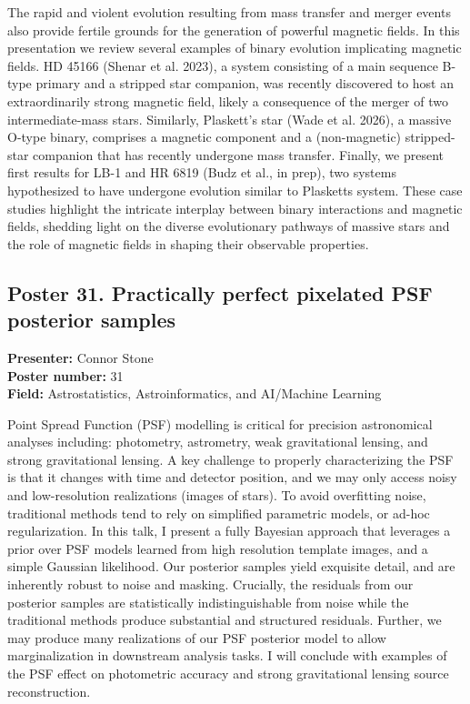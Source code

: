 The rapid and violent evolution resulting from mass transfer and merger events also provide fertile grounds for the generation of powerful magnetic fields. In this presentation we review several examples of binary evolution implicating magnetic fields. HD 45166 (Shenar et al. 2023), a system consisting of a main sequence B-type primary and a stripped star companion, was recently discovered to host an extraordinarily strong magnetic field, likely a consequence of the merger of two intermediate-mass stars. Similarly, Plaskett's star (Wade et al. 2026), a massive O-type binary, comprises a magnetic component and a (non-magnetic) stripped-star companion that has recently undergone mass transfer. Finally, we present first results for LB-1 and HR 6819 (Budz et al., in prep), two systems hypothesized to have undergone evolution similar to Plasketts system. These case studies highlight the intricate interplay between binary interactions and magnetic fields, shedding light on the diverse evolutionary pathways of massive stars and the role of magnetic fields in shaping their observable properties.

\hypertarget{poster-abstract-talk-25}{}\label{poster-abstract-page-talk-25}
\subsection*{Poster 31. Practically perfect pixelated PSF posterior samples}
\textbf{Presenter:} Connor Stone\\
\textbf{Poster number:} 31\\
\textbf{Field:} Astrostatistics, Astroinformatics, and AI/Machine Learning

Point Spread Function (PSF) modelling is critical for precision astronomical analyses including: photometry, astrometry, weak gravitational lensing, and strong gravitational lensing. A key challenge to properly characterizing the PSF is that it changes with time and detector position, and we may only access noisy and low-resolution realizations (images of stars). To avoid overfitting noise, traditional methods tend to rely on simplified parametric models, or ad-hoc regularization. In this talk, I present a fully Bayesian approach that leverages a prior over PSF models learned from high resolution template images, and a simple Gaussian likelihood. Our posterior samples yield exquisite detail, and are inherently robust to noise and masking. Crucially, the residuals from our posterior samples are statistically indistinguishable from noise while the traditional methods produce substantial and structured residuals. Further, we may produce many realizations of our PSF posterior model to allow marginalization in downstream analysis tasks. I will conclude with examples of the PSF effect on photometric accuracy and strong gravitational lensing source reconstruction.

